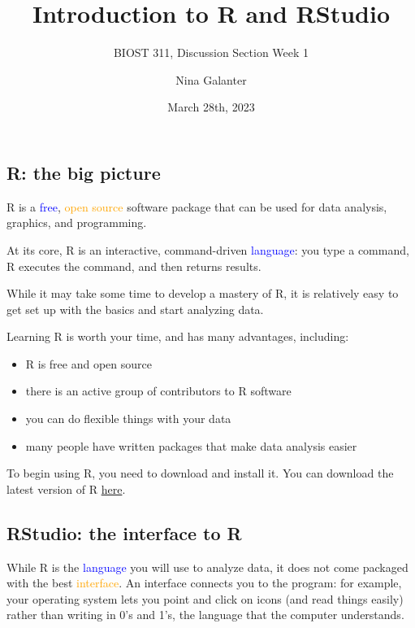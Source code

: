 \documentclass[
]{article}
\title{Introduction to R and RStudio}
\subtitle{BIOST 311, Discussion Section Week 1}
\author{Nina Galanter}
\date{March 28th, 2023}
\providecommand{\tightlist}{%
  \setlength{\itemsep}{0pt}\setlength{\parskip}{0pt}}
\begin{document}
\maketitle

{
\setcounter{tocdepth}{2}
\tableofcontents
}
\hypertarget{r-the-big-picture}{%
\subsection{R: the big picture}\label{r-the-big-picture}}

R is a \textcolor{blue}{free}, \textcolor{orange}{open source} software
package that can be used for data analysis, graphics, and programming.

At its core, R is an interactive, command-driven
\textcolor{blue}{language}: you type a command, R executes the command,
and then returns results.

While it may take some time to develop a mastery of R, it is relatively
easy to get set up with the basics and start analyzing data.

Learning R is worth your time, and has many advantages, including:

\begin{itemize}
\tightlist
\item
  R is free and open source
\item
  there is an active group of contributors to R software
\item
  you can do flexible things with your data
\item
  many people have written packages that make data analysis easier
\end{itemize}

To begin using R, you need to download and install it. You can download
the latest version of R \href{https://www.r-project.org/}{here}.

\hypertarget{rstudio-the-interface-to-r}{%
\subsection{RStudio: the interface to
R}\label{rstudio-the-interface-to-r}}

While R is the \textcolor{blue}{language} you will use to analyze data,
it does not come packaged with the best \textcolor{orange}{interface}.
An interface connects you to the program: for example, your operating
system lets you point and click on icons (and read things easily) rather
than writing in 0's and 1's, the language that the computer understands.
\end{document}
